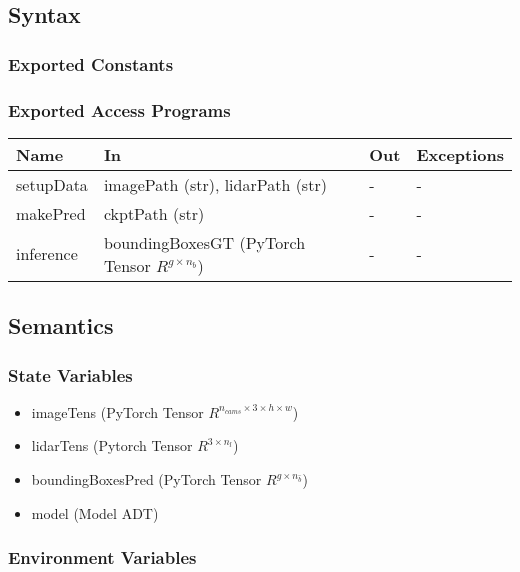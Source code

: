 \documentclass[12pt, titlepage]{article}
\begin{document}
\subsection{Syntax}



\subsubsection{Exported Constants}



\subsubsection{Exported Access Programs}

\begin{center}
\begin{tabular}{p{2cm}|p{6cm}|p{2cm}|p{2cm}}
\hline
\textbf{Name} & \textbf{In} & \textbf{Out} & \textbf{Exceptions} \\
\hline
setupData & imagePath (str), lidarPath (str) & - & - \\
\hline
makePred & ckptPath (str) & - & - \\
\hline
inference & boundingBoxesGT (PyTorch Tensor $R^{g\times{}n_{b}}$) & - & - \\
\hline
\end{tabular}
\end{center}

\subsection{Semantics}

\subsubsection{State Variables}
\begin{itemize}
  \item imageTens (PyTorch Tensor $R^{n_{cams}\times{}3\times{}h\times{}w}$)
  \item lidarTens (Pytorch Tensor $R^{3\times{}n_{l}}$)
  \item boundingBoxesPred (PyTorch Tensor $R^{g\times{}n_{\hat{b}}}$)
  \item model (Model ADT)
\end{itemize}

\subsubsection{Environment Variables}
\end{document}
